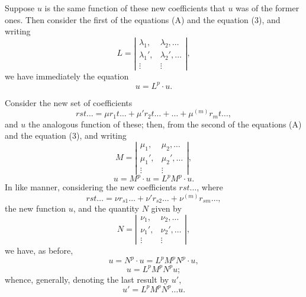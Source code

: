 \documentclass[11pt,a4paper]{article}
\theoremstyle{plain}
\theoremstyle{definition}
\theoremstyle{remark}
\begin{document}
Suppose $u$ is the same function of these new coefficients that $u$ was of the former
ones. Then consider the first of the equations (A) and the equation (3), and writing
\[
L = \left|\begin{array}{cc}
\lambda_1, & \lambda_2, \ldots \\
\lambda_1', & \lambda_2', \ldots \\
\vdots & \vdots
\end{array}\right|
\tag{10},
\]
we have immediately the equation
\[
u = L^p \cdot u
\tag{11}.
\]

Consider the new set of coefficients
\[
rst\ldots = \mu r_1 t\ldots + \mu' r_2 t\ldots + \ldots + \mu^{(m)} r_m t\ldots
\tag{12},
\]
and $u$ the analogous function of these; then, from the second of the equations (A)
and the equation (3), and writing
\[
M = \left|\begin{array}{cc}
\mu_1, & \mu_2, \ldots \\
\mu_1', & \mu_2', \ldots \\
\vdots & \vdots
\end{array}\right|
\tag{13},
\]
\[
u = M^p \cdot u = L^p M^p \cdot u
\tag{14}.
\]
In like manner, considering the new coefficients $rst\ldots$, where
\[
rst\ldots = \nu r_{s1} \ldots + \nu' r_{s2} \ldots + \nu^{(m)} r_{sm} \ldots
\tag{15},
\]
the new function $u$, and the quantity $N$ given by
\[
N = \left|\begin{array}{cc}
\nu_1, & \nu_2, \ldots \\
\nu_1', & \nu_2', \ldots \\
\vdots & \vdots
\end{array}\right|
\tag{16},
\]
we have, as before,
\[
u = N^p \cdot u = L^p M^p N^p \cdot u
\tag{17},
\]
\[
u = L^p M^p N^p u
\tag{18};
\]
whence, generally, denoting the last result by $u'$,
\[
u' = L^p M^p N^p \ldots u
\tag{B, 1}.
\]
\end{document}

